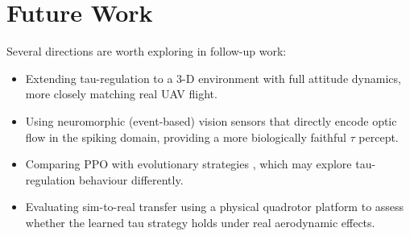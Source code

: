 \section{Future Work}
\label{sec:future}

Several directions are worth exploring in follow-up work:
\begin{itemize}
  \item Extending tau-regulation to a 3-D environment with full attitude dynamics,
        more closely matching real UAV flight.
  \item Using neuromorphic (event-based) vision sensors \cite{clady2014} that directly
        encode optic flow in the spiking domain, providing a more biologically faithful
        $\tau$ percept.
  \item Comparing PPO with evolutionary strategies \cite{such2017}, which may explore
        tau-regulation behaviour differently.
  \item Evaluating sim-to-real transfer using a physical quadrotor platform to assess
        whether the learned tau strategy holds under real aerodynamic effects.
\end{itemize}
